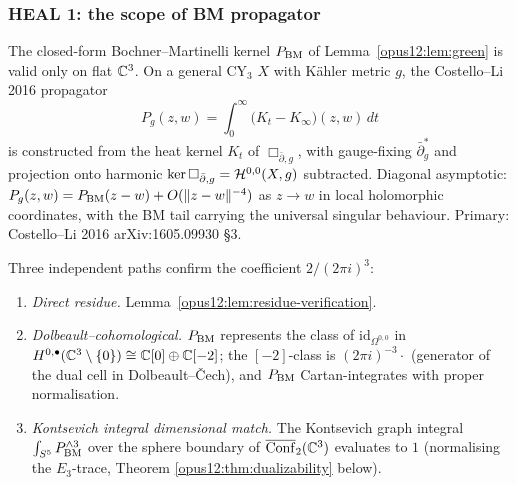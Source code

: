 \subsubsection{HEAL 1: the scope of BM propagator}

\begin{center}
\end{center}

\begin{proposition}\ClaimStatusProposition
\label{opus12:prop:propagator-scope}
The closed-form Bochner--Martinelli kernel
$P_{\mathrm{BM}}$ of Lemma~\ref{opus12:lem:green} is valid only on flat
$\mathbb{C}^3$. On a general CY$_3$ $X$ with K\"ahler metric $g$, the
Costello--Li 2016 propagator
\[
P_g(z, w) = \int_0^\infty \bigl(K_t - K_\infty\bigr)(z, w) \, dt
\]
is constructed from the heat kernel $K_t$ of
$\Box_{\bar\partial, g}$, with gauge-fixing $\bar\partial^*_g$ and
projection onto harmonic $\ker \Box_{\bar\partial, g} = \mathcal{H}^{0,0}(X, g)$
subtracted. Diagonal asymptotic:
$P_g(z, w) = P_{\mathrm{BM}}(z - w) + O(\|z - w\|^{-4})$ as $z \to w$ in local
holomorphic coordinates, with the BM tail carrying the universal
singular behaviour. Primary: Costello--Li 2016 arXiv:1605.09930 §3.
\end{proposition}

\begin{proposition}\ClaimStatusProposition
\label{opus12:prop:bm-verified}
Three independent paths confirm the coefficient $2/(2\pi i)^3$:
\begin{enumerate}
\item \emph{Direct residue.} Lemma~\ref{opus12:lem:residue-verification}.
\item \emph{Dolbeault--cohomological.} $P_{\mathrm{BM}}$ represents the class
of $\mathrm{id}_{\Omega^{0,0}}$ in
$H^{0,\bullet}(\mathbb{C}^3 \setminus \{0\}) \cong \mathbb{C}[0] \oplus \mathbb{C}[-2]$;
the $[-2]$-class is $(2\pi i)^{-3} \cdot$ (generator of the dual
cell in Dolbeault--Čech), and $P_{\mathrm{BM}}$ Cartan-integrates with
proper normalisation.
\item \emph{Kontsevich integral dimensional match.} The Kontsevich
graph integral $\int_{S^5} P^{\wedge 3}_{\mathrm{BM}}$ over the sphere
boundary of $\overline{\mathrm{Conf}}_2(\mathbb{C}^3)$ evaluates to $1$ (normalising
the $E_3$-trace, Theorem \ref{opus12:thm:dualizability} below).
\end{enumerate}
\end{proposition}

